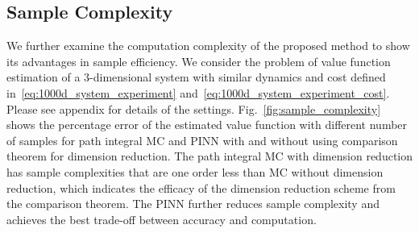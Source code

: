 \documentclass[letterpaper]{article} %
\newcommand{\todo}[1]{\textcolor{blue}{[TODO: #1]}}
\begin{document}

%   
%   


\subsection{Sample Complexity}
We further examine the computation complexity of the proposed method to show its advantages in sample efficiency. We consider the problem of value function estimation of a 3-dimensional system with similar dynamics and cost defined in~\eqref{eq:1000d_system_experiment} and~\eqref{eq:1000d_system_experiment_cost}. 
Please see appendix for details of the settings.
Fig.~\ref{fig:sample_complexity} shows the percentage error of the estimated value function with different number of samples for path integral MC and PINN with and without using comparison theorem for dimension reduction. The path integral MC with dimension reduction has sample complexities that are one order less than MC without dimension reduction, which indicates the efficacy of the dimension reduction scheme from the comparison theorem. The PINN further reduces sample complexity and achieves the best trade-off between accuracy and computation.
\end{document}
